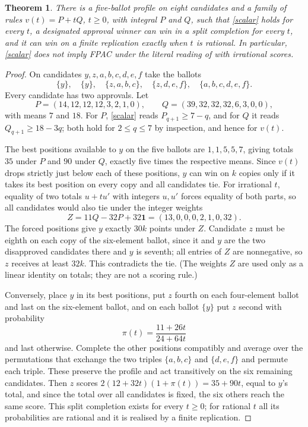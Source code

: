 \documentclass[11pt,a4paper]{article}
\newtheorem{theorem}{Theorem}
\theoremstyle{definition}
\theoremstyle{remark}
\newcommand{\one}{\mathbf 1}
\begin{document}
\begin{theorem}\label{arithmetic}
There is a five-ballot profile on eight candidates and a family of rules $v(t)=P+tQ$, $t\ge0$, with integral $P$ and $Q$, such that \eqref{scalar} holds for every $t$, a designated approval winner can win in a split completion for every $t$, and it can win on a finite replication exactly when $t$ is rational. In particular, \eqref{scalar} does not imply FPAC under the literal reading of \cite[Definition~2]{tlz} with irrational scores.
\end{theorem}
\begin{proof}
On candidates $y,z,a,b,c,d,e,f$ take the ballots
\[
 \{y\},\quad \{y\},\quad \{z,a,b,c\},\quad
 \{z,d,e,f\},\quad \{a,b,c,d,e,f\}.
\]
Every candidate has two approvals. Let
\[
 P=(14,12,12,12,3,2,1,0),\qquad Q=(39,32,32,32,6,3,0,0),
\]
with means $7$ and $18$. For $P$, \eqref{scalar} reads $P_{q+1}\ge7-q$, and for $Q$ it reads $Q_{q+1}\ge18-3q$; both hold for $2\le q\le7$ by inspection, and hence for $v(t)$.

The best positions available to $y$ on the five ballots are $1,1,5,5,7$, giving totals $35$ under $P$ and $90$ under $Q$, exactly five times the respective means. Since $v(t)$ drops strictly just below each of these positions, $y$ can win on $k$ copies only if it takes its best position on every copy and all candidates tie. For irrational $t$, equality of two totals $u+tu'$ with integers $u,u'$ forces equality of both parts, so all candidates would also tie under the integer weights
\[
 Z=11Q-32P+32\one=(13,0,0,0,2,1,0,32).
\]
The forced positions give $y$ exactly $30k$ points under $Z$. Candidate $z$ must be eighth on each copy of the six-element ballot, since it and $y$ are the two disapproved candidates there and $y$ is seventh; all entries of $Z$ are nonnegative, so $z$ receives at least $32k$. This contradicts the tie. (The weights $Z$ are used only as a linear identity on totals; they are not a scoring rule.)

Conversely, place $y$ in its best positions, put $z$ fourth on each four-element ballot and last on the six-element ballot, and on each ballot $\{y\}$ put $z$ second with probability
\[
 \pi(t)=\frac{11+26t}{24+64t}
\]
and last otherwise. Complete the other positions compatibly and average over the permutations that exchange the two triples $\{a,b,c\}$ and $\{d,e,f\}$ and permute each triple. These preserve the profile and act transitively on the six remaining candidates. Then $z$ scores $2(12+32t)(1+\pi(t))=35+90t$, equal to $y$'s total, and since the total over all candidates is fixed, the six others reach the same score. This split completion exists for every $t\ge0$; for rational $t$ all its probabilities are rational and it is realised by a finite replication.
\end{proof}
\end{document}
